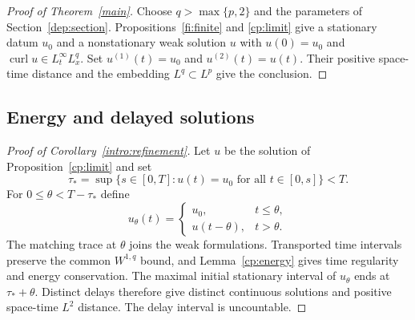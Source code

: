 \documentclass[11pt]{amsart}
\theoremstyle{remark}
\numberwithin{equation}{section}
\begin{document}
\begin{proof}[Proof of Theorem~\ref{main}]
Choose $q>\max\{p,2\}$ and the parameters of
Section~\ref{dep:section}. Propositions~\ref{fi:finite} and
\ref{cp:limit} give a stationary datum $u_0$ and a nonstationary
weak solution $u$ with $u(0)=u_0$ and
$\operatorname{curl}u\in L^\infty_tL^q_x$.
Set $u^{(1)}(t)=u_0$ and $u^{(2)}(t)=u(t)$.
Their positive space-time distance and the embedding $L^q\subset L^p$
give the conclusion.
\end{proof}

\subsection{Energy and delayed solutions}\label{cp:refinements}
\begin{proof}[Proof of Corollary~\ref{intro:refinement}]
Let $u$ be the solution of Proposition~\ref{cp:limit} and set
\[
 \tau_*=\sup\{s\in[0,T]:u(t)=u_0\text{ for all }t\in[0,s]\}<T.
\]
For $0\le\theta<T-\tau_*$ define
\[
 u_\theta(t)=
 \begin{cases}
 u_0,&t\le\theta,\\
 u(t-\theta),&t>\theta.
 \end{cases}
\]
The matching trace at $\theta$ joins the weak formulations.
Transported time intervals preserve the common $W^{1,q}$ bound,
and Lemma~\ref{cp:energy} gives time regularity and energy conservation.
The maximal initial stationary interval of $u_\theta$ ends at
$\tau_*+\theta$. Distinct delays therefore give distinct continuous
solutions and positive space-time $L^2$ distance. The delay interval
is uncountable.
\end{proof}
\end{document}

